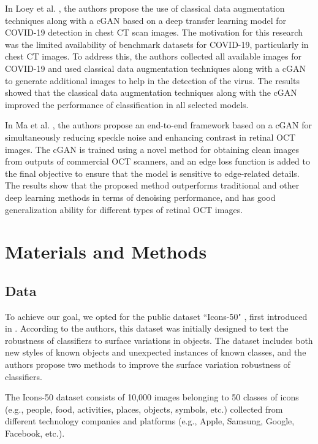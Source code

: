 \documentclass[conference]{IEEEtran}
\begin{document}
In Loey et al. \cite{Loey2020AImages}, the authors propose the use of classical data augmentation techniques along with a cGAN based on a deep transfer learning model for COVID-19 detection in chest CT scan images. The motivation for this research was the limited availability of benchmark datasets for COVID-19, particularly in chest CT images. To address this, the authors collected all available images for COVID-19 and used classical data augmentation techniques along with a cGAN to generate additional images to help in the detection of the virus. The results showed that the classical data augmentation techniques along with the cGAN improved the performance of classification in all selected models.

In Ma et al. \cite{Ma2018SpeckleCGAN}, the authors propose an end-to-end framework based on a cGAN for simultaneously reducing speckle noise and enhancing contrast in retinal OCT images. The cGAN is trained using a novel method for obtaining clean images from outputs of commercial OCT scanners, and an edge loss function is added to the final objective to ensure that the model is sensitive to edge-related details. The results show that the proposed method outperforms traditional and other deep learning methods in terms of denoising performance, and has good generalization ability for different types of retinal OCT images.

\section{Materials and Methods}

\subsection{Data}
To achieve our goal, we opted for the public dataset ``Icons-50" \cite{Icons50}, first introduced in \cite{Hendrycks2018}. According to the authors, this dataset was initially designed to test the robustness of classifiers to surface variations in objects. The dataset includes both new styles of known objects and unexpected instances of known classes, and the authors propose two methods to improve the surface variation robustness of classifiers.

The Icons-50 dataset consists of 10,000 images belonging to 50 classes of icons (e.g., people, food, activities, places, objects, symbols, etc.) collected from different technology companies and platforms (e.g., Apple, Samsung, Google, Facebook, etc.). 
\end{document}
